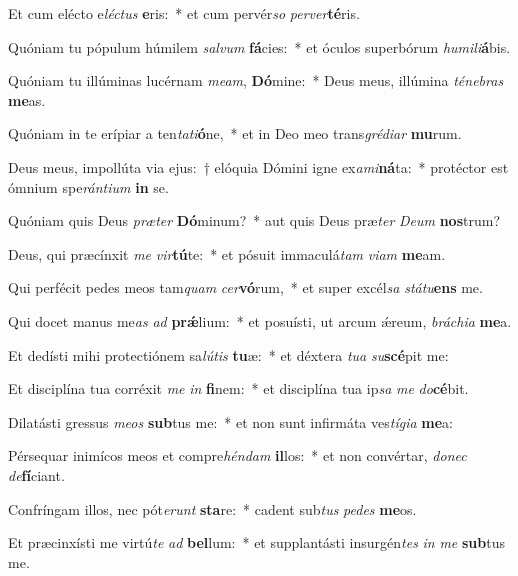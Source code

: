 \item Et cum elécto e\textit{léc}\textit{tus} \textbf{e}ris:~* et cum pervér\textit{so} \textit{per}\textit{ver}\textbf{té}ris.
\item Quóniam tu pópulum húmilem \textit{sal}\textit{vum} \textbf{fá}cies:~* et óculos superbórum \textit{hu}\textit{mi}\textit{li}\textbf{á}bis.
\item Quóniam tu illúminas lucérnam \textit{me}\textit{am}, \textbf{Dó}mine:~* Deus meus, illúmina \textit{té}\textit{ne}\textit{bras} \textbf{me}as.
\item Quóniam in te erípiar a ten\textit{ta}\textit{ti}\textbf{ó}ne,~* et in Deo meo trans\textit{gré}\textit{di}\textit{ar} \textbf{mu}rum.
\item Deus meus, impollúta via ejus:~† elóquia Dómini igne ex\textit{a}\textit{mi}\textbf{ná}ta:~* protéctor est ómnium spe\textit{rán}\textit{ti}\textit{um} \textbf{in} se.
\item Quóniam quis Deus \textit{præ}\textit{ter} \textbf{Dó}minum?~* aut quis Deus præ\textit{ter} \textit{De}\textit{um} \textbf{nos}trum?
\item Deus, qui præcínxit \textit{me} \textit{vir}\textbf{tú}te:~* et pósuit immaculá\textit{tam} \textit{vi}\textit{am} \textbf{me}am.
\item Qui perfécit pedes meos tam\textit{quam} \textit{cer}\textbf{vó}rum,~* et super excél\textit{sa} \textit{stá}\textit{tu}\textbf{ens} me.
\item Qui docet manus me\textit{as} \textit{ad} \textbf{prǽ}lium:~* et posuísti, ut arcum ǽreum, \textit{brá}\textit{chi}\textit{a} \textbf{me}a.
\item Et dedísti mihi protectiónem sa\textit{lú}\textit{tis} \textbf{tu}æ:~* et déxtera \textit{tu}\textit{a} \textit{su}\textbf{scé}pit me:
\item Et disciplína tua corréxit \textit{me} \textit{in} \textbf{fi}nem:~* et disciplína tua ip\textit{sa} \textit{me} \textit{do}\textbf{cé}bit.
\item Dilatásti gressus \textit{me}\textit{os} \textbf{sub}tus me:~* et non sunt infirmáta ves\textit{tí}\textit{gi}\textit{a} \textbf{me}a:
\item Pérsequar inimícos meos et compre\textit{hén}\textit{dam} \textbf{il}los:~* et non convértar, \textit{do}\textit{nec} \textit{de}\textbf{fí}ciant.
\item Confríngam illos, nec pót\textit{e}\textit{runt} \textbf{sta}re:~* cadent sub\textit{tus} \textit{pe}\textit{des} \textbf{me}os.
\item Et præcinxísti me virtú\textit{te} \textit{ad} \textbf{bel}lum:~* et supplantásti insurgén\textit{tes} \textit{in} \textit{me} \textbf{sub}tus me.
